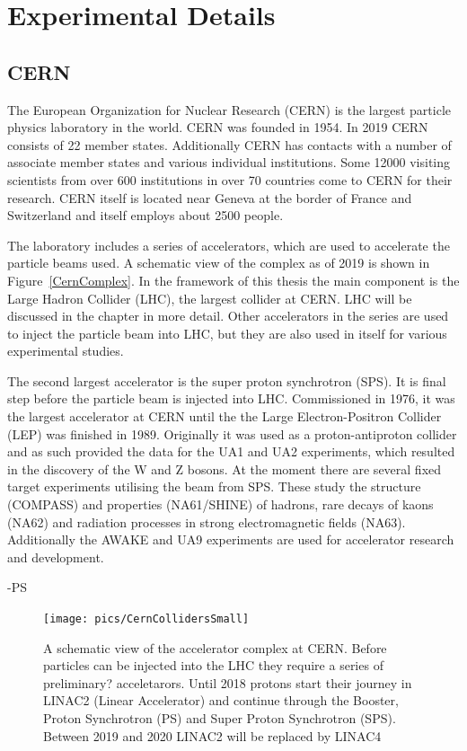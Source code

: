 \section{Experimental Details}
\label{sec:exp}
\subsection{CERN}
The European Organization for Nuclear Research (CERN) is the largest particle physics laboratory in the world. CERN was founded in 1954. In 2019 CERN consists of 22 member states. Additionally CERN has contacts with a number of associate member states and various individual institutions. Some 12000 visiting scientists from over 600 institutions in over 70 countries come to CERN for their research. CERN itself is located near Geneva at the border of France and Switzerland and  itself employs about 2500 people.

The laboratory includes a series of accelerators, which are used to accelerate the particle beams used. A schematic view of the complex as of 2019 is shown in Figure~\ref{CernComplex}. In the framework of this thesis the main component is the Large Hadron Collider (LHC), the largest collider at CERN. LHC will be discussed in the chapter in more detail. Other accelerators in the series are used to inject the particle beam into LHC, but they are also used in itself for various experimental studies. 

The second largest accelerator is the super proton synchrotron (SPS). It is final step before the particle beam is injected into LHC. Commissioned in 1976, it was the largest accelerator at CERN until the the Large Electron-Positron Collider (LEP) was finished in 1989. Originally it was used as a proton-antiproton collider and as such provided the data for the UA1 and UA2 experiments, which resulted in the discovery of the W and Z bosons. At the moment there are several fixed target experiments utilising the beam from SPS. These study the structure (COMPASS) and properties (NA61/SHINE) of hadrons, rare decays of kaons (NA62) and radiation processes in strong electromagnetic fields (NA63). Additionally the AWAKE and UA9 experiments are used for accelerator research and development. 

-PS

\begin{figure}
\centering
\texttt{[image: pics/CernCollidersSmall]}
\caption[CERN collider complex]{ A schematic view of the accelerator complex at CERN. Before particles can be injected into the LHC they require a series of preliminary? acceletarors. Until 2018 protons start their journey in LINAC2 (Linear Accelerator) and continue through the Booster, Proton Synchrotron (PS) and Super Proton Synchrotron (SPS). Between 2019 and 2020 LINAC2 will be replaced by LINAC4~\cite{CernComplex}}

\label{fig:CernComplex}
\end{figure}
